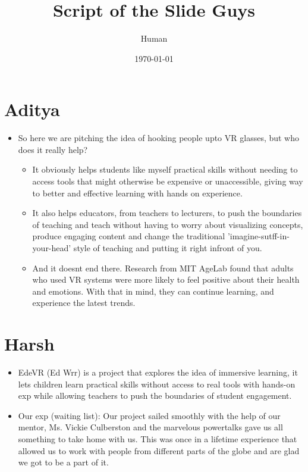 \documentclass[11pt]{article}
\author{Human}
\date{\today}
\title{Script of the Slide Guys}
\begin{document}
\maketitle
\tableofcontents


\section{Aditya}
\label{sec:orga8a551f}
\begin{itemize}
\item So here we are pitching the idea of hooking people upto VR glasses, but who does it really help?
\begin{itemize}
\item It obviously helps students like myself practical skills without needing to access tools  that might otherwise be expensive or unaccessible, giving way to better and effective learning with hands on experience.
\item It also helps educators, from teachers to lecturers, to push the boundaries of teaching and teach without having to worry about visualizing concepts, produce engaging content and change the traditional 'imagine-sutff-in-your-head' style of teaching and putting it right infront of you.
\item And it doesnt end there. Research from MIT AgeLab found that adults who used VR systems were more likely to feel positive about their health and emotions. With that in mind, they can continue learning, and experience the latest trends.
\end{itemize}
\end{itemize}

\section{Harsh}
\label{sec:org9481525}
\begin{itemize}
\item EdeVR (Ed Wrr) is a project that explores the idea of immersive learning, it lets children learn practical skills without access to real tools with hands-on exp while allowing teachers to push the boundaries of student engagement.
\item Our exp (waiting list): Our project sailed smoothly with the help of our mentor, Ms. Vickie Culberston and the marvelous powertalks gave us all something to take home with us. This was once in a lifetime experience that allowed us to work with people from different parts of the globe and are glad we got to be a part of it.
\end{itemize}
\end{document}
